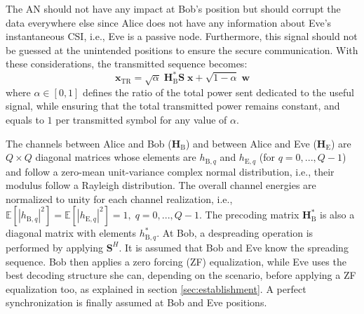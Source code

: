 \documentclass[12pt, draftclsnofoot, onecolumn]{IEEEtran}
\newcommand{\HE}{\textbf{H}_{\text{E}}}
\newcommand{\HB}{\textbf{H}_{\text{B}}}
\newcommand{\spread}{\textbf{S}}
\newcommand{\w}{\textbf{w}}
\newcommand{\mat}[1]{\boldsymbol{\mathrm{#1}}}
\begin{document}
The AN should not have any impact at Bob's position but should corrupt the data everywhere else since Alice does not have any information about Eve's instantaneous CSI, i.e., Eve is a passive node. Furthermore, this signal should not be guessed at the unintended positions to ensure the secure communication. With these considerations, the transmitted sequence becomes:
\begin{equation}
	\textbf{x}_{\text{TR}} = \sqrt{\alpha} \;\HB^*  \spread\; \textbf{x} +  \sqrt{1-\alpha} \; \w
	\label{eq:sym_rad_AN}
\end{equation} 
where $\alpha \in [0,1]$ defines the ratio of the total power sent dedicated to the useful signal, while ensuring that the total transmitted power remains constant, and equals to $1$ per transmitted symbol for any value of $\alpha$.

The channels between Alice and Bob ($\HB$) and between Alice and Eve ($\HE$) are $Q\times Q$ diagonal matrices whose elements are $h_{\text{B},q}$ and $h_{\text{E},q}$ (for $q = 0,...,Q-1$) and follow a zero-mean unit-variance complex normal distribution, i.e., their modulus follow a Rayleigh distribution. The overall channel energies are normalized to unity for each channel realization, i.e., $\mathbb{E}\left[\left|h_{\text{B},q}\right|^2\right]  = \mathbb{E}\left[\left|h_{\text{E},q}\right|^2\right] = 1, \; q = 0,...,Q-1$. The precoding matrix $\HB^*$ is also a diagonal matrix with elements $h_{\text{B},q}^*$. At Bob, a despreading operation is performed by applying $\spread^H$. It is assumed that Bob and Eve know the spreading sequence. Bob then applies a zero forcing (ZF) equalization, while Eve uses the best decoding structure \mat{G} she can, depending on the scenario, before applying a ZF equalization too, as explained in section \ref{sec:establishment}. A perfect synchronization is finally assumed at Bob and Eve positions.\\







%
\end{document}
